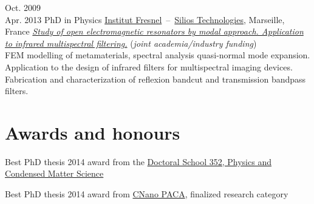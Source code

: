 \documentclass{cv}
\begin{document}
\begin{entrylist}
	\entry
	{Oct. 2009\\Apr. 2013}
	{PhD in Physics}
	{\href{http://www.fresnel.fr/}{Institut Fresnel}~--~\href{http://www.silios.com/}{Silios Technologies}, Marseille, France}
	{\emph{\href{http://tel.archives-ouvertes.fr/index.php?halsid=slas337fv1oqlj1okgkq7q42i5&view_this_doc=tel-00918651&version=1}
			{Study of open electromagnetic resonators by modal approach.
				Application to infrared multispectral filtering.}} (\emph{joint academia/industry funding})\\
		FEM modelling of metamaterials, spectral analysis quasi-normal mode expansion.
		Application to the design of infrared filters for multispectral imaging devices.
		Fabrication and characterization of reflexion bandcut and transmission bandpass filters.
	}

\end{entrylist}

\vspace*{-0.3cm}
\section{Awards and honours}

  {Best PhD thesis 2014 award} from the {\href{https://ecole-doctorale-352.univ-amu.fr/en}{Doctoral School 352, Physics and Condensed Matter Science}}

  {Best PhD thesis 2014 award from {\href{https://www.cnano-paca.fr/index.php?option=com_content&view=article&id=80}{CNano PACA}}, finalized research category}


  \nocite{vial2022open,vial2016class,VialQMEM}
  
\printbibliography[title=Selected publications]
\end{document}
